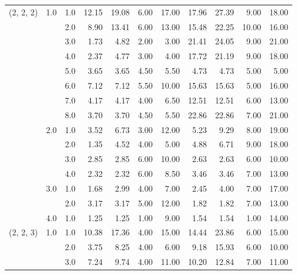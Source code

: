 \begin{tabular}{lllrrrrrrrr}
(2, 2, 2) & 1.0 & 1.0  &      12.15 &     19.08 &  6.00 &  17.00 &      17.96 &     27.39 &  9.00 &  18.00 \\
          &     & 2.0  &       8.90 &     13.41 &  6.00 &  13.00 &      15.48 &     22.25 & 10.00 &  16.00 \\
          &     & 3.0  &       1.73 &      4.82 &  2.00 &   3.00 &      21.41 &     24.05 &  9.00 &  21.00 \\
          &     & 4.0  &       2.37 &      4.77 &  3.00 &   4.00 &      17.72 &     21.19 &  9.00 &  18.00 \\
          &     & 5.0  &       3.65 &      3.65 &  4.50 &   5.50 &       4.73 &      4.73 &  5.00 &   5.00 \\
          &     & 6.0  &       7.12 &      7.12 &  5.50 &  10.00 &      15.63 &     15.63 &  5.00 &  16.00 \\
          &     & 7.0  &       4.17 &      4.17 &  4.00 &   6.50 &      12.51 &     12.51 &  6.00 &  13.00 \\
          &     & 8.0  &       3.70 &      3.70 &  4.50 &   5.50 &      22.86 &     22.86 &  7.00 &  21.00 \\
          & 2.0 & 1.0  &       3.52 &      6.73 &  3.00 &  12.00 &       5.23 &      9.29 &  8.00 &  19.00 \\
          &     & 2.0  &       1.35 &      4.52 &  4.00 &   5.00 &       4.88 &      6.71 &  9.00 &  18.00 \\
          &     & 3.0  &       2.85 &      2.85 &  6.00 &  10.00 &       2.63 &      2.63 &  6.00 &  10.00 \\
          &     & 4.0  &       2.32 &      2.32 &  6.00 &   8.50 &       3.46 &      3.46 &  7.00 &  13.00 \\
          & 3.0 & 1.0  &       1.68 &      2.99 &  4.00 &   7.00 &       2.45 &      4.00 &  7.00 &  17.00 \\
          &     & 2.0  &       3.17 &      3.17 &  5.00 &  12.00 &       1.82 &      1.82 &  7.00 &  13.00 \\
          & 4.0 & 1.0  &       1.25 &      1.25 &  1.00 &   9.00 &       1.54 &      1.54 &  1.00 &  14.00 \\
(2, 2, 3) & 1.0 & 1.0  &      10.38 &     17.36 &  4.00 &  15.00 &      14.44 &     23.86 &  6.00 &  15.00 \\
          &     & 2.0  &       3.75 &      8.25 &  4.00 &   6.00 &       9.18 &     15.93 &  6.00 &  10.00 \\
          &     & 3.0  &       7.24 &      9.74 &  4.00 &  11.00 &      10.20 &     12.84 &  7.00 &  11.00 \\

\end{tabular}
